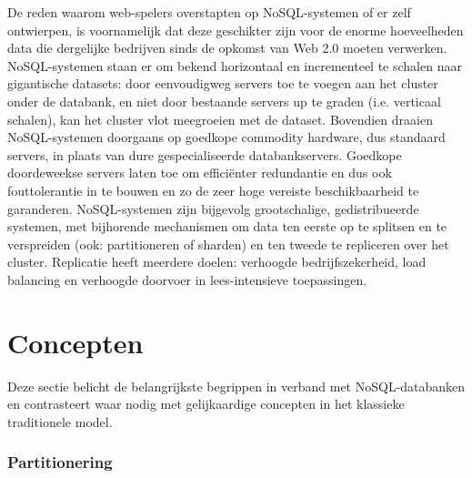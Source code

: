 De reden waarom web-spelers overstapten op NoSQL-systemen of er zelf ontwierpen, is voornamelijk dat deze geschikter zijn voor de enorme hoeveelheden data die dergelijke bedrijven sinds de opkomst van Web 2.0 moeten verwerken. NoSQL-systemen staan er om bekend horizontaal en incrementeel te schalen naar gigantische datasets: door eenvoudigweg servers toe te voegen aan het cluster onder de databank, en niet door bestaande servers up te graden (i.e. verticaal schalen), kan het cluster vlot meegroeien met de dataset. Bovendien draaien NoSQL-systemen doorgaans op goedkope commodity hardware, dus standaard servers, in plaats van dure gespecialiseerde databankservers. Goedkope doordeweekse servers laten toe om effici\"enter redundantie en dus ook fouttolerantie in te bouwen en zo de zeer hoge vereiste beschikbaarheid te garanderen. NoSQL-systemen zijn bijgevolg grootschalige, gedistribueerde systemen, met bijhorende mechanismen om data ten eerste op te splitsen en te verspreiden (ook: partitioneren of sharden) en ten tweede te repliceren over het cluster. Replicatie heeft meerdere doelen: verhoogde bedrijfszekerheid, load balancing en verhoogde doorvoer in lees-intensieve toepassingen.

\section{Concepten}

Deze sectie belicht de belangrijkste begrippen in verband met NoSQL-databanken en contrasteert waar nodig met gelijkaardige concepten in het klassieke traditionele model.

\subsubsection{Partitionering}

